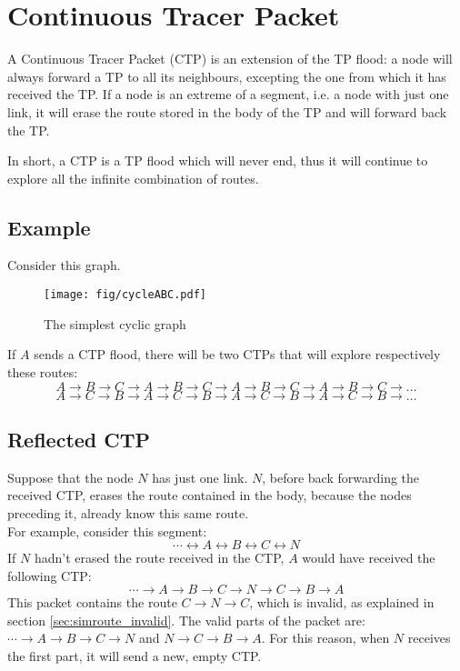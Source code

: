 \documentclass[a4paper]{article}
\begin{document}
\newpage
\section{Continuous Tracer Packet}
\label{sec:CTP}

A Continuous Tracer Packet (CTP) is an extension of the TP flood: a node will
always forward a TP to all its neighbours, excepting the one from which it has
received the TP.
If a node is an extreme of a segment, i.e. a node with just one link, it will
erase the route stored in the body of the TP and will forward back the TP.

In short, a CTP is a TP flood which will never end, thus it will continue to
explore all the infinite combination of routes. 

\subsection*{Example}
Consider this graph.
\begin{figure}[h]
	\begin{center}
		\texttt{[image: fig/cycleABC.pdf]}
	\end{center}
	\caption{The simplest cyclic graph}
	\label{fig:cycleABC}
\end{figure}
If $A$ sends a CTP flood, there will be two CTPs that will explore
respectively these routes:
\[
	 A \rightarrow B \rightarrow C \rightarrow A \rightarrow B \rightarrow
	 C \rightarrow A \rightarrow B \rightarrow C \rightarrow A \rightarrow
	 B \rightarrow C \rightarrow \dots
\]
\[
	 A \rightarrow C \rightarrow B \rightarrow A \rightarrow C \rightarrow
	 B \rightarrow A \rightarrow C \rightarrow B \rightarrow A \rightarrow
	 C \rightarrow B \rightarrow \dots
\]

\subsection{Reflected CTP}
\label{sec:reflected_CTP}

Suppose that the node $N$ has just one link.
$N$, before back forwarding the received CTP, erases the route contained in
the body, because the nodes preceding it, already know this same route.
\\
For example, consider this segment:
\[ \cdots \leftrightarrow A \leftrightarrow B \leftrightarrow C \leftrightarrow N \]
If $N$ hadn't erased the route received in the CTP, $A$ would have received
the following CTP:
\[
\cdots \rightarrow A \rightarrow B \rightarrow C \rightarrow N \rightarrow C \rightarrow B \rightarrow A
\]
This packet contains the route $C \rightarrow N \rightarrow C$, which is
invalid, as explained in section \ref{sec:simroute_invalid}.
The valid parts of the packet are: $\cdots \rightarrow A \rightarrow B
\rightarrow C \rightarrow N$ and $N \rightarrow C \rightarrow B \rightarrow
A$. For this reason, when $N$ receives the first part, it will send a new,
empty CTP.
\end{document}
